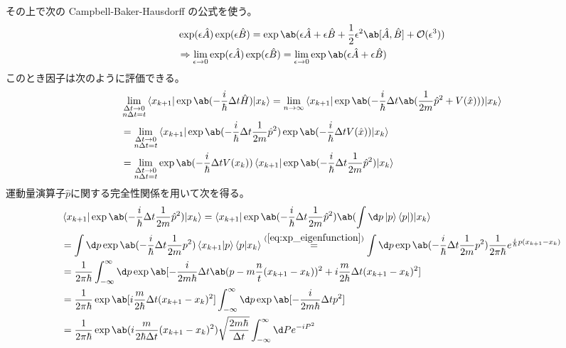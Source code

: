 その上で次の Campbell-Baker-Hausdorff の公式を使う。
\begin{equation}
  \begin{split}
    &\exp(\epsilon\hat{A})\exp(\epsilon\hat{B})
    =\exp\ab(\epsilon\hat{A}+\epsilon\hat{B}
    +\frac{1}{2}\epsilon^2\ab[\hat{A},\hat{B}]
    +\mathcal{O}(\epsilon^3)) \\
    &\Rightarrow
    \lim_{\epsilon\to0}
    \exp(\epsilon\hat{A})\exp(\epsilon\hat{B})
    =\lim_{\epsilon\to0}
    \exp\ab(\epsilon\hat{A}+\epsilon\hat{B})
  \end{split}
\end{equation}
このとき因子は次のように評価できる。
\begin{equation}
  \begin{split}
    &\lim_{\substack{\Delta t\to0\\n\Delta t=t}}
    \braket{x_{k+1}|\exp\ab(-\frac{i}{\hbar}\Delta t\hat{H})|x_k}
    =\lim_{n\to\infty}
    \braket{x_{k+1}|\exp\ab(-\frac{i}{\hbar}\Delta t
      \ab(\frac{1}{2m}\hat{p}^2+V(\hat{x}))
      )|x_k}  \\
    &=\lim_{\substack{\Delta t\to0\\n\Delta t=t}}
    \braket{x_{k+1}|
      \exp\ab(-\frac{i}{\hbar}\Delta t
      \frac{1}{2m}\hat{p}^2)
      \exp\ab(-\frac{i}{\hbar}\Delta t
      V(\hat{x}))
      |x_k} \\
    &=\lim_{\substack{\Delta t\to0\\n\Delta t=t}}
    \exp\ab(-\frac{i}{\hbar}\Delta tV(x_k))
    \braket{x_{k+1}|
      \exp\ab(-\frac{i}{\hbar}\Delta t
      \frac{1}{2m}\hat{p}^2)
      |x_k}
  \end{split}
\end{equation}
運動量演算子$\hat{p}$に関する完全性関係を用いて次を得る。
\begin{equation}
  \begin{split}
    &\braket{x_{k+1}|
      \exp\ab(-\frac{i}{\hbar}\Delta t
      \frac{1}{2m}\hat{p}^2)
      |x_k}
    =\braket{x_{k+1}|
      \exp\ab(-\frac{i}{\hbar}\Delta t
      \frac{1}{2m}\hat{p}^2)
      \ab(\int\d p\ket{p}\bra{p})
      |x_k} \\
    &=\int\d p
    \exp\ab(-\frac{i}{\hbar}\Delta t
    \frac{1}{2m}p^2)
    \braket{x_{k+1}|p}
    \braket{p|x_{k}}
    \overset{(\ref{eq:xp_eigenfunction})}{=}
    \int\d p
    \exp\ab(-\frac{i}{\hbar}\Delta t
    \frac{1}{2m}p^2)
    \frac{1}{2\pi\hbar}e^{\frac{i}{\hbar}p(x_{k+1}-x_k)} \\
    &=\frac{1}{2\pi\hbar}\int_{-\infty}^\infty\d p
    \exp\ab[
      -\frac{i}{2m\hbar}\Delta t
      \ab(p-m\frac{n}{t}(x_{k+1}-x_k))^2
      +i\frac{m}{2\hbar}\Delta t(x_{k+1}-x_k)^2
    ] \\
    &=\frac{1}{2\pi\hbar}
    \exp\ab[i\frac{m}{2\hbar}\Delta t(x_{k+1}-x_k)^2]
    \int_{-\infty}^\infty\d p
    \exp\ab[
      -\frac{i}{2m\hbar}\Delta tp^2
    ] \\
    &=\frac{1}{2\pi\hbar}
    \exp\ab(i\frac{m}{2\hbar\Delta t}(x_{k+1}-x_k)^2)
    \sqrt{\frac{2m\hbar}{\Delta t}}
    \int_{-\infty}^\infty\d P
    e^{-iP^2}
  \end{split}
\end{equation}
